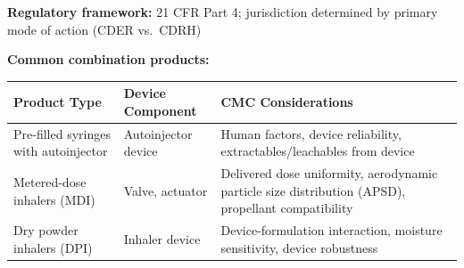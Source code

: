 \documentclass[
  11pt,
  a4paper,
]{report}
\begin{document}
\textbf{Regulatory framework:} 21 CFR Part 4; jurisdiction determined by
primary mode of action (CDER vs.~CDRH)

\textbf{Common combination products:}

\begin{longtable}[]{@{}lll@{}}
\toprule
\begin{minipage}[b]{0.24\columnwidth}\raggedright
Product Type\strut
\end{minipage} & \begin{minipage}[b]{0.32\columnwidth}\raggedright
Device Component\strut
\end{minipage} & \begin{minipage}[b]{0.35\columnwidth}\raggedright
CMC Considerations\strut
\end{minipage}\tabularnewline
\midrule
\endhead
\begin{minipage}[t]{0.24\columnwidth}\raggedright
Pre-filled syringes with autoinjector\strut
\end{minipage} & \begin{minipage}[t]{0.32\columnwidth}\raggedright
Autoinjector device\strut
\end{minipage} & \begin{minipage}[t]{0.35\columnwidth}\raggedright
Human factors, device reliability, extractables/leachables from
device\strut
\end{minipage}\tabularnewline
\begin{minipage}[t]{0.24\columnwidth}\raggedright
Metered-dose inhalers (MDI)\strut
\end{minipage} & \begin{minipage}[t]{0.32\columnwidth}\raggedright
Valve, actuator\strut
\end{minipage} & \begin{minipage}[t]{0.35\columnwidth}\raggedright
Delivered dose uniformity, aerodynamic particle size distribution
(APSD), propellant compatibility\strut
\end{minipage}\tabularnewline
\begin{minipage}[t]{0.24\columnwidth}\raggedright
Dry powder inhalers (DPI)\strut
\end{minipage} & \begin{minipage}[t]{0.32\columnwidth}\raggedright
Inhaler device\strut
\end{minipage} & \begin{minipage}[t]{0.35\columnwidth}\raggedright
Device-formulation interaction, moisture sensitivity, device
robustness\strut
\end{minipage}\tabularnewline

\end{longtable}
\end{document}

